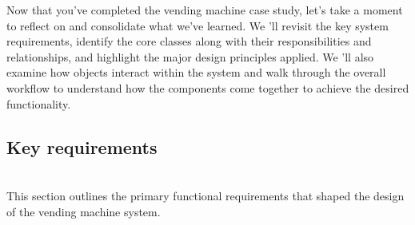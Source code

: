 

Now that you've completed the vending machine case study, let's take a moment to reflect on and consolidate what we've learned. We 'll revisit the key system requirements, identify the core classes along with their responsibilities and relationships, and highlight the major design principles applied. We
'll also examine how objects interact within the system and walk through the overall workflow to understand how the components come together to achieve the desired functionality.

\subsection{Key requirements}\label{dPBZqYkhZOn4JeAD6dU6v}
\\
This section outlines the primary functional requirements that shaped the design of the vending machine system.

